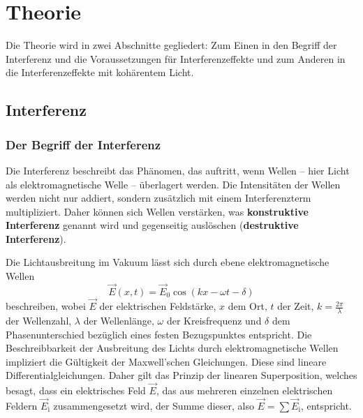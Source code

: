 \section{Theorie}
\label{sec:Theorie}

Die Theorie wird in zwei Abschnitte gegliedert: Zum Einen in den Begriff der Interferenz und 
die Voraussetzungen für Interferenzeffekte und zum Anderen in die Interferenzeffekte mit 
kohärentem Licht.


\subsection{Interferenz}
\label{sec:interferenz}

\subsubsection{Der Begriff der Interferenz}
\label{sec:interferenzdef}
Die Interferenz beschreibt das Phänomen, das auftritt, wenn Wellen -- hier Licht als 
elektromagnetische Welle -- überlagert werden. 
Die Intensitäten der Wellen werden nicht nur addiert, sondern zusätzlich mit einem
Interferenzterm multipliziert. Daher können sich Wellen verstärken, was \textbf{konstruktive 
Interferenz} genannt wird und gegenseitig auslöschen (\textbf{destruktive Interferenz}).

Die Lichtausbreitung im Vakuum lässt sich durch ebene elektromagnetische Wellen
\begin{equation}
	\label{eqn:ebenewelle}
	\vec{E}(x,t) = \vec{E}_0 \cos(k x - \omega t - \delta) 
\end{equation}
beschreiben, wobei $\vec{E}$ der elektrischen Feldstärke, $x$ dem Ort, $t$ der Zeit, $k=\frac{2\pi}{\lambda}$ der Wellenzahl, $\lambda$
der Wellenlänge, $\omega$ der Kreisfrequenz und $\delta$ dem Phasenunterschied bezüglich eines 
festen Bezugspunktes entspricht.
Die Beschreibbarkeit der Ausbreitung des Lichts durch elektromagnetische Wellen impliziert die 
Gültigkeit der Maxwell'schen Gleichungen. Diese sind lineare Differentialgleichungen. Daher 
gilt das Prinzip der linearen Superposition, welches besagt, dass ein elektrisches Feld
$\vec{E}$, das aus mehreren einzelnen elektrischen Feldern $\vec{E}_{\mathrm{i}}$
zusammengesetzt wird, der Summe dieser, also $\vec{E} = \sum \vec{E}_{\mathrm{i}}$, entspricht.


